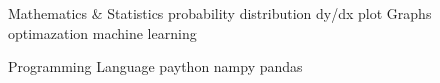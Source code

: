 Mathematics & Statistics
    probability distribution
    dy/dx
    plot
    Graphs
    optimazation
    machine learning
    

Programming Language
    paython
    nampy pandas

